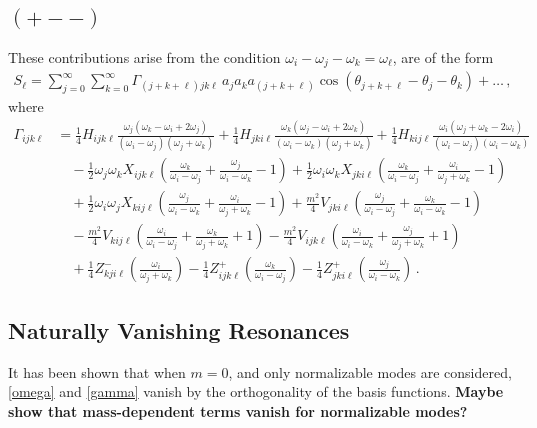 \documentclass[letterpaper,11pt]{article}
\newcommand{\oi}{\omega_i}
\newcommand{\oj}{\omega_j}
\newcommand{\ok}{\omega_k}
\newcommand{\ol}{\omega_\ell}
\newcommand{\thj}{\theta_j}
\newcommand{\thk}{\theta_k}
\begin{document}

\subsection{$(+--)$}

These contributions arise from the condition $\oi - \oj - \ok = \ol$, are of the form
\begin{align}
S_\ell = \sum_{j=0}^\infty \sum_{k=0}^\infty \Gamma_{(j+k+\ell) jk\ell} \, a_j a_k a_{(j+k+\ell)} \cos \left( \theta_{j+k+\ell} - \thj - \thk \right) + \ldots \, ,
\end{align}
where
\begin{align}
\label{gamma}
\Gamma_{ijk\ell} &= \frac{1}{4} H_{ijk\ell} \frac{\oj (\ok - \oi + 2\oj)}{(\oi - \oj)(\oj + \ok)} + \frac{1}{4} H_{jki\ell} \frac{\ok (\oj - \oi + 2\ok)}{(\oi - \ok)(\oj + \ok)} + \frac{1}{4} H_{kij\ell} \frac{\oi (\oj + \ok - 2\oi)}{(\oi - \oj)(\oi - \ok)} \nonumber \\
% 
& \quad -\frac{1}{2} \oj \ok X_{ijk\ell} \left( \frac{\ok}{\oi - \oj} + \frac{\oj}{\oi - \ok} - 1\right) + \frac{1}{2} \oi \ok X_{jki\ell} \left( \frac{\ok}{\oi - \oj} + \frac{\oi}{\oj + \ok} - 1 \right) \nonumber \\
%
& \quad + \frac{1}{2} \oi \oj X_{kij\ell} \left( \frac{\oj}{\oi - \ok} + \frac{\oi}{\oj + \ok} -1 \right) + \frac{m^2}{4} V_{jki\ell} \left( \frac{\oj}{\oi - \oj} + \frac{\ok}{\oi - \ok} -1\right) \nonumber \\
%
& \quad - \frac{m^2}{4} V_{kij\ell} \left( \frac{\oi}{\oi - \oj} + \frac{\ok}{\oj + \ok} + 1\right) - \frac{m^2}{4} V_{ijk\ell} \left( \frac{\oi}{\oi - \ok} + \frac{\oj}{\oj + \ok} + 1 \right) \nonumber \\
%
& \quad + \frac{1}{4} Z^-_{kji\ell} \left( \frac{\oi}{\oj + \ok}\right) - \frac{1}{4} Z^+_{ijk\ell} \left( \frac{\ok}{\oi - \oj} \right) - \frac{1}{4} Z^+_{jki\ell} \left( \frac{\oj}{\oi - \ok}\right) \, .
\end{align}


\subsection{Naturally Vanishing Resonances}

It has been shown that when $m=0$, and only normalizable modes are considered, \eqref{omega} and \eqref{gamma} vanish by the orthogonality of the basis functions. {\bf Maybe show that mass-dependent terms vanish for normalizable modes?}
\end{document}
